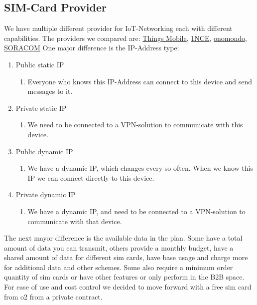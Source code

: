 \subsection{SIM-Card Provider}
We have multiple different provider for IoT-Networking each with different capabilities.
The providers we compared are: \href{https://www.thingsmobile.com/de/private/plans/individuelle-datenpakete}{Things Mobile}, \href{https://1nce.com/en-eu/1nce-connect/features/sim-cards/iot-sim-europe}{1NCE}, \href{https://onomondo.com/}{onomondo}, \href{https://www.soracom.io/pricing/eu-pricing/}{SORACOM}
One major difference is the IP-Address type:
\begin{enumerate}
    \item Public static IP
    \begin{enumerate}
        \item Everyone who knows this IP-Address can connect to this device and send messages to it.
    \end{enumerate}
    \item Private static IP
    \begin{enumerate}
        \item We need to be connected to a VPN-solution to communicate with this device.
    \end{enumerate}
    \item Public dynamic IP
    \begin{enumerate}
        \item We have a dynamic IP, which changes every so often. When we know this IP we can connect directly to this device.
    \end{enumerate}
    \item Private dynamic IP
    \begin{enumerate}
        \item We have a dynamic IP, and need to be connected to a VPN-solution to communicate with that device.
    \end{enumerate}
\end{enumerate}
The next mayor difference is the available data in the plan. Some have a total amount of data you can transmit, others provide a monthly budget, have a shared amount of data for different sim cards, have base usage and charge more for additional data and other schemes.
Some also require a minimum order quantity of sim cards or have other features or only perform in the B2B space.
For ease of use and cost control we decided to move forward with a free sim card from o2 from a private contract.
